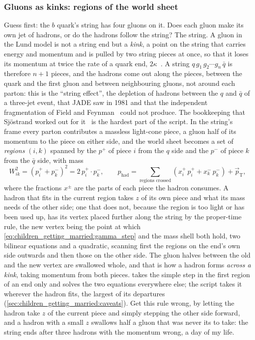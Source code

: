 \subsubsection{Gluons as kinks: regions of the world sheet}
\label{sec:children_getting_married:kinks}

Guess first: the $b$ quark's string has four gluons on it. Does each gluon
make its own jet of hadrons, or do the hadrons follow the string? The
string. A gluon in the Lund model is not a string end but a \emph{kink}, a
point on the string that carries energy and momentum and is pulled by two
string pieces at once, so that it loses its momentum at twice the rate of a
quark end, $2\kappa$~\cite{Andersson:1983ia}. A string
$q\,g_1\,g_2\cdots g_n\,\bar q$ is therefore $n+1$ pieces, and the hadrons
come out along the pieces, between the quark and the first gluon and
between neighbouring gluons, not around each parton: this is the ``string
effect'', the depletion of hadrons between the $q$ and $\bar q$ of a
three-jet event, that JADE saw in 1981 and that the independent
fragmentation of Field and Feynman~\cite{Field:1977fa} could not produce.
The bookkeeping that Sj\"ostrand worked out for it~\cite{Sjostrand:1984ic}
is the hardest part of the script. In the string's frame every parton
contributes a massless light-cone piece, a gluon half of its momentum to
the piece on either side, and the world sheet becomes a set of
\emph{regions} $(i,k)$ spanned by the $p^+$ of piece $i$ from the $q$ side
and the $p^-$ of piece $k$ from the $\bar q$ side, with mass
\begin{equation}
  W_{ik}^2=(p_i^++p_k^-)^2=2\,p_i^+\!\cdot p_k^-,
  \qquad
  p_{\mathrm{had}}=\sum_{\text{regions crossed}}
  \left(x^+_{i}\,p_i^+ + x^-_{k}\,p_k^-\right)+\vec p_{\mathrm{T}},
  \label{eq:children_getting_married:regions}
\end{equation}
where the fractions $x^\pm$ are the parts of each piece the hadron
consumes. A hadron that fits in the current region takes $z$ of its own
piece and what its mass needs of the other side; one that does not, because
the region is too light or has been used up, has its vertex placed further
along the string by the proper-time rule, the new vertex being the point at
which \cref{eq:children_getting_married:gamma_step} and the mass shell both
hold, two bilinear equations and a quadratic, scanning first the regions on
the end's own side outwards and then those on the other side. The gluon
halves between the old and the new vertex are swallowed whole, and that is
how a hadron forms \emph{across a kink}, taking momentum from both pieces.
\PYTHIA takes the simple step in the first region of an end only and
solves the two equations everywhere else; the script takes it wherever the
hadron fits, the largest of its departures
(\cref{sec:children_getting_married:caveats}).
Get this rule wrong, by letting the hadron take $z$ of the current piece
and simply stepping the other side forward, and a hadron with a small $z$
swallows half a gluon that was never its to take: the string ends after
three hadrons with the momentum wrong, a day of my life.

